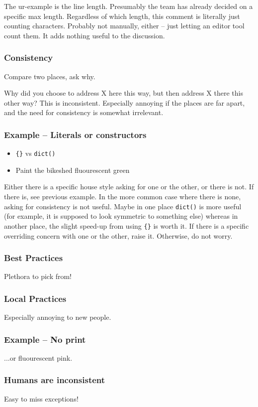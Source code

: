 The ur-example is the line length.
Presumably the team has already decided on a specific max length.
Regardless of which length,
this comment is literally just counting characters.
Probably not manually, either --
just letting an editor tool count them.
It adds nothing useful to the discussion.

\begin{frame}
\frametitle{Consistency}
Compare two places,
ask why.
\end{frame}

Why did you choose to address X here this way,
but then address X there this other way?
This is inconsistent.
Especially annoying if the places are far apart,
and the need for consistency is somewhat irrelevant.

\begin{frame}[fragile]
\frametitle{Example -- Literals or constructors}
\begin{itemize}
\item \verb|{}| vs \verb|dict()|
\item Paint the bikeshed fluourescent green
\end{itemize}
\end{frame}

Either there is a specific house style asking for one or the other,
or there is not.
If there is, see previous example.
In the more common case where there is none,
asking for consistency is not useful.
Maybe in one place \verb|dict()| is more useful
(for example, it is supposed to look symmetric to something else)
whereas in another place,
the slight speed-up from using \verb|{}| is worth it.
If there is a specific overriding concern with one or the other,
raise it.
Otherwise, do not worry.

\begin{frame}
\frametitle{Best Practices}
Plethora to pick from!
\end{frame}

\begin{frame}
\frametitle{Local Practices}
Especially annoying to new people.
\end{frame}

\begin{frame}
\frametitle{Example -- No print}
...or fluourescent pink.
\end{frame}

\begin{frame}
\frametitle{Humans are inconsistent}
Easy to miss exceptions!
\end{frame}

